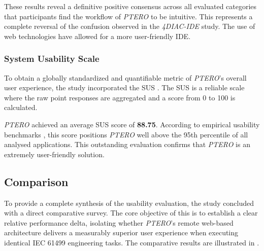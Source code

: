 These results reveal a definitive positive consensus across all evaluated categories that participants find the workflow of \textit{PTERO} to be intuitive. This represents a complete reversal of the confusion observed in the \textit{4DIAC-IDE} study. The use of web technologies have allowed for a more user-friendly \ac{IDE}.

\subsubsection*{System Usability Scale}
To obtain a globally standardized and quantifiable metric of \textit{PTERO}'s overall user experience, the study incorporated the \ac{SUS} \cite{lewis_system_2018}. The \ac{SUS} is a reliable scale where the raw point responses are aggregated and a score from 0 to 100 is calculated.

\textit{PTERO} achieved an average SUS score of \textbf{88.75}. According to empirical usability benchmarks  \cite{lewis_item_2018}, this score positions \textit{PTERO} well above the 95th percentile of all analysed applications. This outstanding evaluation confirms that \textit{PTERO} is an extremely user-friendly solution.

\subsection{Comparison}
To provide a complete synthesis of the usability evaluation, the study concluded with a direct comparative survey. The core objective of this is to establish a clear relative performance delta, isolating whether \textit{PTERO}'s remote web-based architecture delivers a measurably superior user experience when executing identical IEC 61499 engineering tasks. The comparative results are illustrated in .

